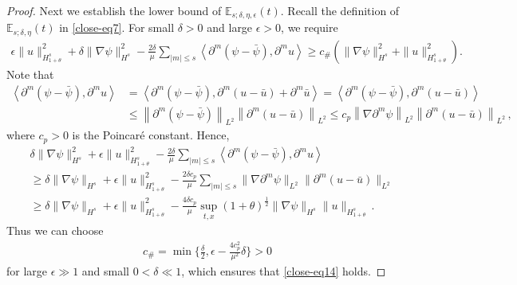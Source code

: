 \documentclass[reqno,11pt]{amsart}
\numberwithin{equation}{section}
\begin{document}
\begin{proof}
Next we establish the lower bound of $\mathbb{E}_{s;\delta,\eta, \epsilon}(t)$. Recall the definition of $\mathbb{E}_{s;\delta,\eta}(t)$ in \eqref{close-eq7}. For small $\delta>0$ and large $\epsilon > 0$, we require 
\begin{equation}\label{close-eq14}
\begin{aligned}
\epsilon \| u \|^2_{H^s_{1+ \theta}} + \delta \|\nabla \psi\|_{H^s}^2
- \frac{2\delta}{\mu} \sum_{|m| \leq s} \left\langle \partial^m (\psi - \bar{\psi}), \partial^m u \right\rangle
\geq c_{\#} \left( \|\nabla \psi\|_{H^s}^2 + \|u \|_{H^s_{1 + \theta}}^2 \right).
\end{aligned}
\end{equation}
Note that
\begin{equation*}
\begin{aligned}
\left\langle \partial^m (\psi - \bar{\psi}), \partial^m u \right\rangle
&= \left\langle \partial^m (\psi - \bar{\psi}), \partial^m (u - \bar{u}) + \partial^m \bar{u} \right\rangle = \left\langle \partial^m (\psi - \bar{\psi}), \partial^m (u - \bar{u}) \right\rangle\\&
\leq \left\| \partial^m (\psi - \bar{\psi}) \right\|_{L^2} \left\| \partial^m (u - \bar{u}) \right\|_{L^2} \leq c_{p} \left\| \nabla \partial^m \psi \right\|_{L^2} \left\| \partial^m (u - \bar{u}) \right\|_{L^2} \,,
\end{aligned}
\end{equation*}
where $c_{p} > 0$ is the Poincar\'e constant. Hence,
\begin{equation*}
\begin{aligned}
&\delta \|\nabla \psi\|_{H^s}^2 + \epsilon \| u \|^2_{H^s_{1+ \theta}}
- \frac{2\delta}{\mu} \sum_{|m| \leq s} \left\langle \partial^m (\psi -\bar{\psi}), \partial^m u \right\rangle\\&
\geq \delta \|\nabla \psi\|_{H^s} + \epsilon \| u \|^2_{H^s_{1+ \theta}}
- \frac{2\delta c_{p}}{\mu} \sum_{|m| \leq s} \|\nabla \partial^m \psi\|_{L^2} \|\partial^m (u -\bar{u})\|_{L^2} \\
& \geq \delta \|\nabla \psi\|_{H^s} + \epsilon \| u \|^2_{H^s_{1+ \theta}}
- \frac{4 \delta c_{p}}{\mu} \sup_{t,x} (1 + \theta)^\frac{1}{2} \| \nabla \psi \|_{H^s} \| u \|_{H^s_{1+\theta}} \,.
\end{aligned}
\end{equation*}
Thus we can choose
\begin{equation}\label{close-eq15}
\begin{aligned}
c_\# = \min \{ \frac{\delta}{2}, \epsilon - \frac{4 c_p^2}{\mu^2} \delta  \} > 0
\end{aligned}
\end{equation}
for large $\epsilon \gg 1$ and small $0 < \delta \ll 1$, which ensures that \eqref{close-eq14} holds.


\end{proof}
\end{document}
